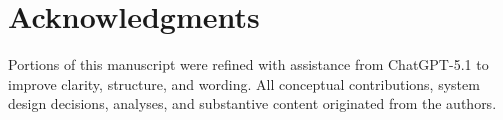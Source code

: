 \documentclass[review]{vgtc}
\begin{document}
\vspace{-6pt}
\fi
\ifanonymous\else
\section*{Acknowledgments}
Portions of this manuscript were refined with assistance from ChatGPT-5.1 to improve clarity, structure, and wording. All conceptual contributions, system design decisions, analyses, and substantive content originated from the authors.
\fi

\balance


\end{document}
